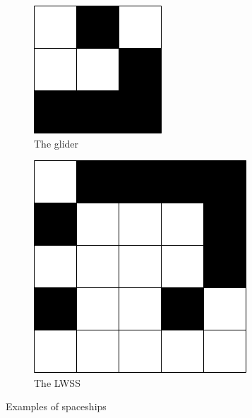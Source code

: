 \documentclass{l4proj}
\begin{document}
\begin{figure}[h]
\centering
\begin{subfigure}[b]{0.4\textwidth}
    \includegraphics[width=\textwidth]{dissertation/images/gol_structures/glider.png} 
    \caption{The glider}
    \label{fig:subim1}
\end{subfigure}
\hfill
\begin{subfigure}[b]{0.4\textwidth}
    \includegraphics[width=\textwidth]{dissertation/images/gol_structures/LWSS.png} 
    \caption{The LWSS}
    \label{fig:subim1}
\end{subfigure}

\caption{Examples of spaceships}
\end{figure}
\end{document}
